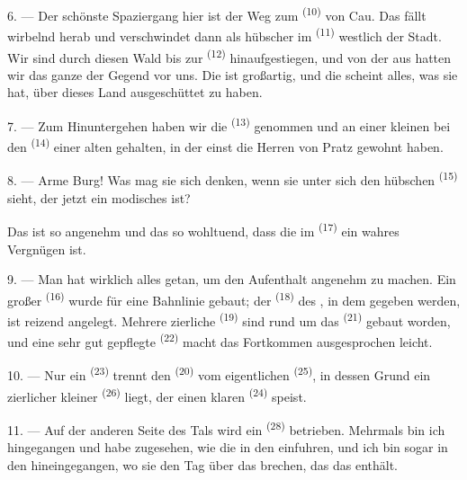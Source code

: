6. --- Der schönste Spaziergang hier ist der Weg zum 
\textsuperscript{(10)} von Cau. Das  fällt wirbelnd herab
und verschwindet dann als hübscher  im 
\textsuperscript{(11)} westlich der Stadt. Wir sind durch diesen Wald bis zur
 \textsuperscript{(12)} hinaufgestiegen, und von der
 aus hatten wir das ganze  der Gegend vor
uns. Die  ist großartig, und die  scheint alles,
was sie hat, über dieses Land ausgeschüttet zu haben.

7. --- Zum Hinuntergehen haben wir die  \textsuperscript{(13)}
genommen und an einer kleinen  bei den 
\textsuperscript{(14)} einer alten  gehalten, in der einst die
Herren von Pratz gewohnt haben.

8. --- Arme Burg! Was mag sie sich denken, wenn sie unter sich den hübschen
 \textsuperscript{(15)} sieht, der jetzt ein modisches 
ist?

Das  ist so angenehm und das  so wohltuend, dass
die  im  \textsuperscript{(17)} ein wahres Vergnügen
ist.

\VUsaut{3.0mm}
\VUsaut{3.0mm}

9. --- Man hat wirklich alles getan, um den Aufenthalt angenehm zu machen. Ein
großer  \textsuperscript{(16)} wurde für eine Bahnlinie gebaut; der
 \textsuperscript{(18)} des , in dem
 gegeben werden, ist reizend angelegt. Mehrere zierliche 
\textsuperscript{(19)} sind rund um das  \textsuperscript{(21)}
gebaut worden, und eine sehr gut gepflegte  \textsuperscript{(22)}
macht das Fortkommen ausgesprochen leicht.

10. --- Nur ein  \textsuperscript{(23)} trennt den 
\textsuperscript{(20)} vom eigentlichen  \textsuperscript{(25)}, in dessen
Grund ein zierlicher kleiner  \textsuperscript{(26)} liegt, der einen
klaren  \textsuperscript{(24)} speist.

11. --- Auf der anderen Seite des Tals wird ein 
\textsuperscript{(28)} betrieben. Mehrmals bin ich hingegangen und habe zugesehen,
wie die  in den  einfuhren, und ich bin sogar in
den  hineingegangen, wo sie den Tag über das  brechen,
das das  enthält.

